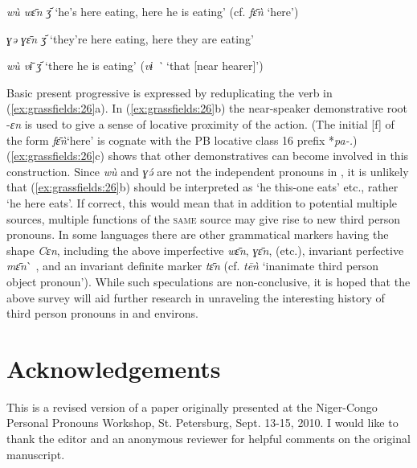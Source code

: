 \documentclass[output=paper]{langsci/langscibook}
\begin{document}
  \ex  \textit{wù wɛ̄n ʒ{\ɯ᷄}} ‘he’s here eating, here he is eating’  (cf. \textit{fɛ̄ǹ }‘here’)

    \textit{ɣə ɣɛ̄n ʒ{\ɯ᷄}}  ‘they’re here eating, here they are eating’

  \ex  \textit{wù vɨ̄ ʒ{\ɯ᷄} } ‘there he is eating’ (\textit{vɨ  \`{}} ‘that [near hearer]’)
\z
\z


\noindent
Basic present progressive is expressed by reduplicating the verb in (\ref{ex:grassfields:26}a). In (\ref{ex:grassfields:26}b) the near-speaker demonstrative root -\textit{ɛn} is used to give a sense of locative proximity of the action. (The initial [f] of the form \textit{fɛ̄ǹ}‘here’ is cognate with the PB locative class 16 prefix *\textit{pa-.}) (\ref{ex:grassfields:26}c) shows that other demonstratives can become involved in this construction. Since \textit{wù} and \textit{ɣə́} are not the independent pronouns in , it is unlikely that (\ref{ex:grassfields:26}b) should be interpreted as ‘he this-one eats’ etc., rather ‘he here eats’. If correct, this would mean that in addition to potential multiple sources, multiple functions of the \textsc{same} source may give rise to new third person pronouns. In some  languages there are other grammatical markers having the shape \textit{Cɛn}, including the above imperfective \textit{wɛ̄n}, \textit{ɣɛ̄n}, (etc.), invariant perfective \textit{mɛ̄n}\`{} , and an invariant definite marker \textit{tɛ̄n} (cf.  \textit{tēǹ} ‘inanimate third person object pronoun’). While such speculations are non-conclusive, it is hoped that the above survey will aid further research in unraveling the interesting history of third person pronouns in  and environs.

\section*{Acknowledgements}
This is a revised version of a paper originally presented at the Niger-Congo Personal Pronouns Workshop, St. Petersburg, Sept. 13-15, 2010. I would like to thank the editor and an anonymous reviewer for helpful comments on the original manuscript. 

{\sloppy
\printbibliography[heading=subbibliography,notkeyword=this]
}

 
\end{document}
